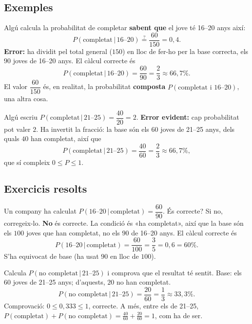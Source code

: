 \subsection{Exemples}

\begin{exemple}
Algú calcula la probabilitat de completar \textbf{sabent que} el jove té 16--20 anys així:
\[
P(\text{completat}\,|\,\text{16--20}) \overset{?}{=} \frac{60}{150}=0,4.
\]
\textbf{Error:} ha dividit pel total general ($150$) en lloc de fer-ho per la base
correcta, els $90$ joves de 16--20 anys. El càlcul correcte és
\[
P(\text{completat}\,|\,\text{16--20})=\frac{60}{90}=\frac{2}{3}\approx 66,7\%.
\]
El valor $\dfrac{60}{150}$ és, en realitat, la probabilitat \textbf{composta}
$P(\text{completat i 16--20})$, una altra cosa.
\end{exemple}

\begin{exemple}
Algú escriu $P(\text{completat}\,|\,\text{21--25})=\dfrac{40}{20}=2$. \textbf{Error
evident:} cap probabilitat pot valer $2$. Ha invertit la fracció: la base són els $60$
joves de 21--25 anys, dels quals $40$ han completat, així que
\[
P(\text{completat}\,|\,\text{21--25})=\frac{40}{60}=\frac{2}{3}\approx 66,7\%,
\]
que sí compleix $0\le P\le 1$.
\end{exemple}

\subsection{Exercicis resolts}

\begin{exresolt}
Un company ha calculat $P(\text{16--20}\,|\,\text{completat})=\dfrac{60}{90}$. És
correcte? Si no, corregeix-lo.
\solucio
\textbf{No} és correcte. La condició és «ha completat», així que la base són els $100$
joves que han completat, no els $90$ de 16--20 anys. El càlcul correcte és
\[
P(\text{16--20}\,|\,\text{completat})=\frac{60}{100}=\frac{3}{5}=0,6=60\%.
\]
S'ha equivocat de base (ha usat $90$ en lloc de $100$).
\end{exresolt}

\begin{exresolt}
Calcula $P(\text{no completat}\,|\,\text{21--25})$ i comprova que el resultat té sentit.
\solucio
Base: els $60$ joves de 21--25 anys; d'aquests, $20$ no han completat.
\[
P(\text{no completat}\,|\,\text{21--25})=\frac{20}{60}=\frac{1}{3}\approx 33,3\%.
\]
Comprovació: $0\le 0,333\le 1$, correcte. A més, entre els de 21--25,
$P(\text{completat})+P(\text{no completat})=\frac{40}{60}+\frac{20}{60}=1$, com ha de ser.
\end{exresolt}

